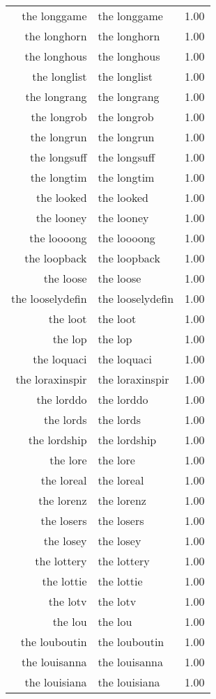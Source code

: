 \begin{table}[ht]
\begin{tabular}{rlr}
  the longgame & the longgame & 1.00 \\ 
  the longhorn & the longhorn & 1.00 \\ 
  the longhous & the longhous & 1.00 \\ 
  the longlist & the longlist & 1.00 \\ 
  the longrang & the longrang & 1.00 \\ 
  the longrob & the longrob & 1.00 \\ 
  the longrun & the longrun & 1.00 \\ 
  the longsuff & the longsuff & 1.00 \\ 
  the longtim & the longtim & 1.00 \\ 
  the looked & the looked & 1.00 \\ 
  the looney & the looney & 1.00 \\ 
  the loooong & the loooong & 1.00 \\ 
  the loopback & the loopback & 1.00 \\ 
  the loose & the loose & 1.00 \\ 
  the looselydefin & the looselydefin & 1.00 \\ 
  the loot & the loot & 1.00 \\ 
  the lop & the lop & 1.00 \\ 
  the loquaci & the loquaci & 1.00 \\ 
  the loraxinspir & the loraxinspir & 1.00 \\ 
  the lorddo & the lorddo & 1.00 \\ 
  the lords & the lords & 1.00 \\ 
  the lordship & the lordship & 1.00 \\ 
  the lore & the lore & 1.00 \\ 
  the loreal & the loreal & 1.00 \\ 
  the lorenz & the lorenz & 1.00 \\ 
  the losers & the losers & 1.00 \\ 
  the losey & the losey & 1.00 \\ 
  the lottery & the lottery & 1.00 \\ 
  the lottie & the lottie & 1.00 \\ 
  the lotv & the lotv & 1.00 \\ 
  the lou & the lou & 1.00 \\ 
  the louboutin & the louboutin & 1.00 \\ 
  the louisanna & the louisanna & 1.00 \\ 
  the louisiana & the louisiana & 1.00 \\ 

\end{tabular}
\end{table}
